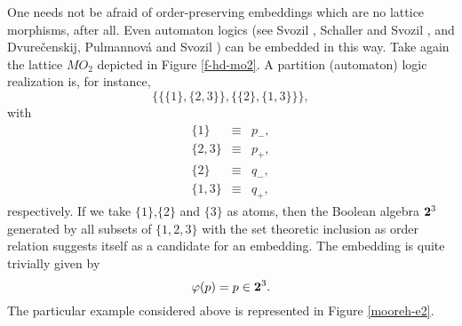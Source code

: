 One needs not be afraid of order-preserving embeddings which are no lattice
morphisms, after all.
Even automaton logics (see Svozil \cite[Chapter 11]{svozil-93},
Schaller and Svozil \cite{schaller-92,schaller-95,schaller-96},
and Dvure{\v{c}}enskij, Pulmannov{\'{a}} and Svozil \cite{dvur-pul-svo})
can be embedded in this way.
Take again the lattice $MO_2$ depicted in Figure
\ref{f-hd-mo2}. A partition (automaton) logic realization is, for
instance,
$$\{\{\{1\},\{2,3\}\},\{\{2\},\{1,3\}\}\},$$
with
\begin{eqnarray*}
\{1\}&\equiv &p_-,\\
\{2,3\}&\equiv& p_+,\\
\{2\}&\equiv & q_-,\\
\{1,3\}&\equiv &q_+
,\end{eqnarray*}
respectively.
If we take $\{1\}$,$\{2\}$ and $\{3\}$ as atoms, then the Boolean algebra
${\bf 2}^3$
generated by all subsets of $\{1,2,3\}$ with the set theoretic inclusion
as order relation suggests itself as a candidate for an embedding. The
embedding  is quite trivially given by
$$\varphi (p)=p\in {\bf 2}^{3}.$$
The particular example considered above is
represented in Figure \ref{mooreh-e2}.

